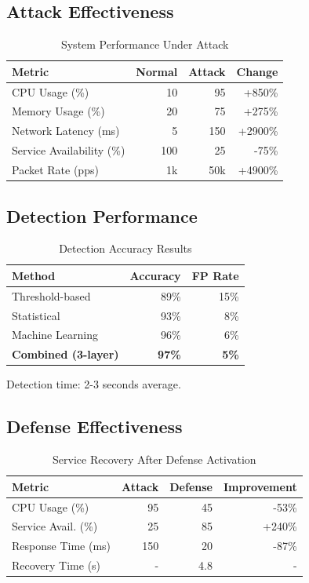 \documentclass[conference]{IEEEtran}
\begin{document}
\subsection{Attack Effectiveness}

\begin{table}[h]
\centering
\caption{System Performance Under Attack}
\begin{tabular}{lrrr}
\toprule
\textbf{Metric} & \textbf{Normal} & \textbf{Attack} & \textbf{Change} \\
\midrule
CPU Usage (\%) & 10 & 95 & +850\% \\
Memory Usage (\%) & 20 & 75 & +275\% \\
Network Latency (ms) & 5 & 150 & +2900\% \\
Service Availability (\%) & 100 & 25 & -75\% \\
Packet Rate (pps) & 1k & 50k & +4900\% \\
\bottomrule
\end{tabular}
\end{table}

\subsection{Detection Performance}

\begin{table}[h]
\centering
\caption{Detection Accuracy Results}
\begin{tabular}{lrr}
\toprule
\textbf{Method} & \textbf{Accuracy} & \textbf{FP Rate} \\
\midrule
Threshold-based & 89\% & 15\% \\
Statistical & 93\% & 8\% \\
Machine Learning & 96\% & 6\% \\
\textbf{Combined (3-layer)} & \textbf{97\%} & \textbf{5\%} \\
\bottomrule
\end{tabular}
\end{table}

Detection time: 2-3 seconds average.

\subsection{Defense Effectiveness}

\begin{table}[h]
\centering
\caption{Service Recovery After Defense Activation}
\begin{tabular}{lrrr}
\toprule
\textbf{Metric} & \textbf{Attack} & \textbf{Defense} & \textbf{Improvement} \\
\midrule
CPU Usage (\%) & 95 & 45 & -53\% \\
Service Avail. (\%) & 25 & 85 & +240\% \\
Response Time (ms) & 150 & 20 & -87\% \\
Recovery Time (s) & - & 4.8 & - \\
\bottomrule
\end{tabular}
\end{table}
\end{document}
